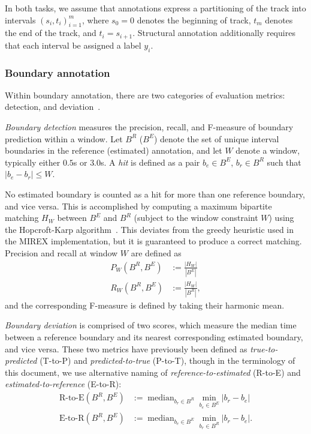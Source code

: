 \documentclass{article}
\DeclareMathOperator*{\median}{median}
\def\defeq{\ensuremath{:=}}
\begin{document}
In both tasks, we assume that annotations express a partitioning of the track 
into intervals ${(s_i, t_i)}_{i=1}^m$, where $s_0=0$ denotes the beginning of track, 
$t_m$ denotes the end of the track, and $t_i = s_{i+1}$.
Structural annotation additionally requires that each interval be assigned a label $y_i$.


\subsubsection{Boundary annotation}

Within boundary annotation, there are two categories of evaluation metrics: detection,
and deviation~\cite{turnbull2007supervised}.  

\emph{Boundary detection} measures the precision, recall, and F-measure of boundary prediction within a window.
Let $B^R$ ($B^E$) denote the set of unique interval boundaries in the reference (estimated) annotation, and let $W$ denote 
a window, typically either $0.5$s or $3.0$s.  
A \emph{hit} is defined as a pair $b_e \in B^E$, $b_r \in B^R$ such that $|b_e - b_r|
\leq W$.  

No estimated boundary is counted as a hit for more than one reference boundary, and vice versa.
This is accomplished by computing a maximum bipartite matching $H_W$ between $B^E$ and $B^R$ (subject to the window constraint $W$)
using the Hopcroft-Karp algorithm~\cite{hopcroft1973n}.  This deviates from the greedy heuristic used in the MIREX
implementation, but it is guaranteed to produce a correct matching.  Precision and recall at window $W$ are defined as
\begin{align}
P_W(B^R, B^E) &\defeq \frac{|H_W|}{|B^E|}\\
R_W(B^R, B^E) &\defeq \frac{|H_W|}{|B^R|},
\end{align}
and the corresponding F-measure is defined by taking their harmonic mean.

\emph{Boundary deviation} is comprised of two scores, which measure the median time between a reference boundary and its nearest corresponding estimated boundary, and vice versa.
These two metrics have previously been defined as \emph{true-to-predicted} (T-to-P) and \emph{predicted-to-true} (P-to-T), though in the terminology of this document, we use 
alternative naming of \emph{reference-to-estimated} (R-to-E) and \emph{estimated-to-reference} (E-to-R):
\begin{align}
\text{R-to-E}(B^R, B^E) &\defeq \displaystyle\median_{b_r \in B^R} \min_{b_e \in B^E} \left|b_r - b_e\right|\\
\text{E-to-R}(B^R, B^E) &\defeq \displaystyle\median_{b_e \in B^E} \min_{b_r \in B^R} \left|b_r - b_e\right|.
\end{align}
\end{document}
